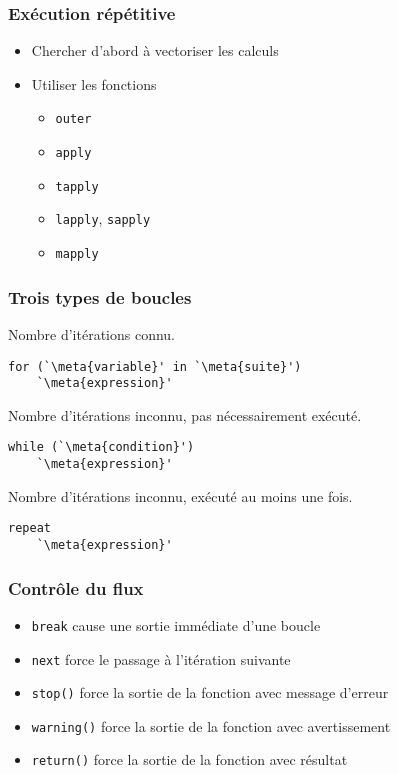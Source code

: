 \begin{frame}
  \frametitle{Exécution répétitive}

  \begin{itemize}
  \item Chercher d'abord à vectoriser les calculs
  \item Utiliser les fonctions
    \begin{itemize}
    \item \texttt{outer}
    \item \texttt{apply}
    \item \texttt{tapply}
    \item \texttt{lapply}, \texttt{sapply}
    \item \texttt{mapply}
    \end{itemize}
  \end{itemize}
\end{frame}

\begin{frame}[fragile=singleslide]
  \frametitle{Trois types de boucles}

  Nombre d'itérations connu.
  \begin{Schunk}
\begin{lstlisting}
for (`\meta{variable}' in `\meta{suite}')
    `\meta{expression}'
\end{lstlisting}
  \end{Schunk}

  Nombre d'itérations inconnu, pas nécessairement exécuté.
  \begin{Schunk}
\begin{lstlisting}
while (`\meta{condition}')
    `\meta{expression}'
\end{lstlisting}
  \end{Schunk}

  Nombre d'itérations inconnu, exécuté au moins une fois.
  \begin{Schunk}
\begin{lstlisting}
repeat
    `\meta{expression}'
\end{lstlisting}
  \end{Schunk}
\end{frame}

\begin{frame}
  \frametitle{Contrôle du flux}

  \begin{itemize}
  \item \texttt{break} cause une sortie immédiate d'une boucle
  \item \texttt{next} force le passage à l'itération suivante
  \item \texttt{stop()} force la sortie de la fonction avec message
    d'erreur
  \item \texttt{warning()} force la sortie de la fonction avec
    avertissement
  \item \texttt{return()} force la sortie de la fonction avec résultat
  \end{itemize}
\end{frame}

